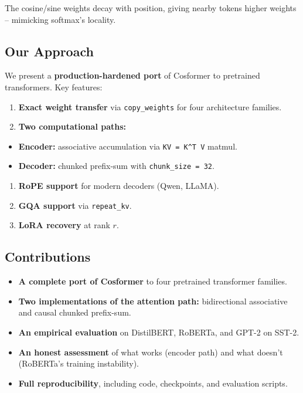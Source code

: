 The cosine/sine weights decay with position, giving nearby tokens higher 
weights -- mimicking softmax's locality.

\subsection{Our Approach}

We present a \textbf{production-hardened port} of Cosformer to pretrained 
transformers. Key features:

\begin{enumerate}
\item \textbf{Exact weight transfer} via \texttt{copy\_weights} for four architecture families.
\item \textbf{Two computational paths:}
\end{enumerate}
\begin{itemize}
\item \textbf{Encoder:} associative accumulation via \texttt{KV = K^T V} matmul.
\item \textbf{Decoder:} chunked prefix-sum with \texttt{chunk\_size = 32}.
\end{itemize}
\begin{enumerate}
\item \textbf{RoPE support} for modern decoders (Qwen, LLaMA).
\item \textbf{GQA support} via \texttt{repeat\_kv}.
\item \textbf{LoRA recovery} at rank $r$.

\end{enumerate}
\subsection{Contributions}

\begin{itemize}
\item \textbf{A complete port of Cosformer} to four pretrained transformer families.
\item \textbf{Two implementations of the attention path:} bidirectional associative
  and causal chunked prefix-sum.
\item \textbf{An empirical evaluation} on DistilBERT, RoBERTa, and GPT-2 on SST-2.
\item \textbf{An honest assessment} of what works (encoder path) and what doesn't
  (RoBERTa's training instability).
\item \textbf{Full reproducibility}, including code, checkpoints, and evaluation scripts.

\end{itemize}
